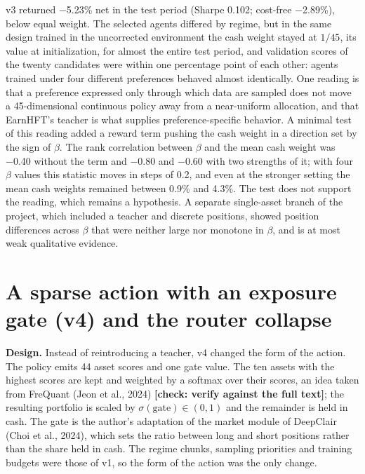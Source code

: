 \documentclass[12pt,a4paper]{report}
\begin{document}
v3 returned −5.23\% net in the test period (Sharpe 0.102; cost-free
−2.89\%), below equal weight. The selected agents differed by regime,
but in the same design trained in the uncorrected environment the cash
weight stayed at \(1/45\), its value at initialization, for almost the
entire test period, and validation scores of the twenty candidates were
within one percentage point of each other: agents trained under four
different preferences behaved almost identically. One reading is that a
preference expressed only through which data are sampled does not move a
45-dimensional continuous policy away from a near-uniform allocation,
and that EarnHFT's teacher is what supplies preference-specific
behavior. A minimal test of this reading added a reward term pushing the
cash weight in a direction set by the sign of \(\beta\). The rank
correlation between \(\beta\) and the mean cash weight was −0.40 without
the term and −0.80 and −0.60 with two strengths of it; with four
\(\beta\) values this statistic moves in steps of 0.2, and even at the
stronger setting the mean cash weights remained between 0.9\% and 4.3\%.
The test does not support the reading, which remains a hypothesis. A
separate single-asset branch of the project, which included a teacher
and discrete positions, showed position differences across \(\beta\)
that were neither large nor monotone in \(\beta\), and is at most weak
qualitative evidence.

\section{A sparse action with an exposure gate (v4) and the router
collapse}\label{a-sparse-action-with-an-exposure-gate-v4-and-the-router-collapse}

\textbf{Design.} Instead of reintroducing a teacher, v4 changed the form
of the action. The policy emits 44 asset scores and one gate value. The
ten assets with the highest scores are kept and weighted by a softmax
over their scores, an idea taken from FreQuant (Jeon et al., 2024)
\textbf{{[}check: verify against the full text{]}}; the resulting
portfolio is scaled by \(\sigma(\text{gate}) \in (0,1)\) and the
remainder is held in cash. The gate is the author's adaptation of the
market module of DeepClair (Choi et al., 2024), which sets the ratio
between long and short positions rather than the share held in cash. The
regime chunks, sampling priorities and training budgets were those of
v1, so the form of the action was the only change.
\end{document}
